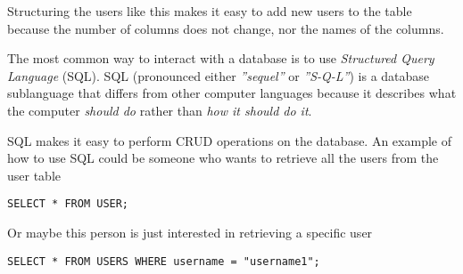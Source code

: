Structuring the users like this makes it easy to add new users to the table because the number of columns does not change, nor the names of the columns.

The most common way to interact with a database is to use \textit{Structured Query Language} (SQL).
SQL (pronounced either \textit{''sequel''} or \textit{''S-Q-L''}) is a database sublanguage that differs from other computer languages because it describes what the computer \textit{should do} rather than \textit{how it should do it}.\cite{SQLIntroduction}

SQL makes it easy to perform CRUD operations on the database.\cite{OracleWhatIsDatabase}
An example of how to use SQL could be someone who wants to retrieve all the users from the user table

\begin{lstlisting}
SELECT * FROM USER;
\end{lstlisting}

Or maybe this person is just interested in retrieving a specific user

\begin{lstlisting}
SELECT * FROM USERS WHERE username = "username1";
\end{lstlisting}




